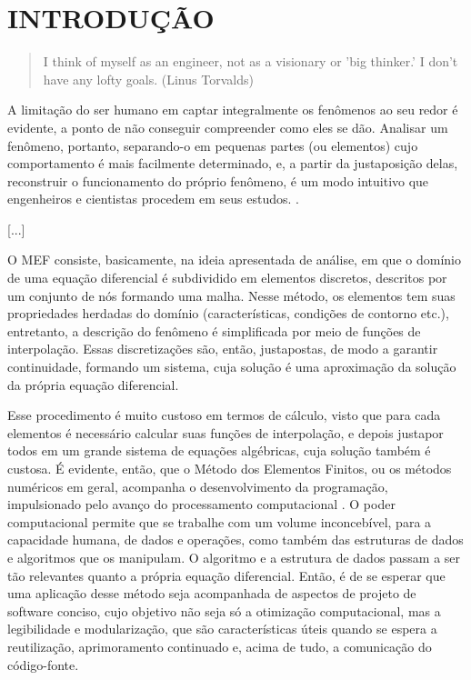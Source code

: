 

\chapter{INTRODUÇÃO}

\begin{quote}
    I think of myself as an engineer, not as a visionary or 'big thinker.' I don't have any lofty goals.
    (Linus Torvalds)  
\end{quote}

A limitação do ser humano em captar integralmente os fenômenos ao seu redor é evidente, a ponto de não conseguir compreender como eles se dão. Analisar um fenômeno, portanto, separando-o em pequenas partes (ou elementos) cujo comportamento é mais facilmente determinado, e, a partir da justaposição delas, reconstruir o funcionamento do próprio fenômeno, é um modo intuitivo que engenheiros e cientistas procedem em seus estudos. \cite[p. 2]{Zin}.


[...]


O MEF consiste, basicamente, na ideia apresentada de análise, em que o domínio de uma equação diferencial é subdividido em elementos discretos, descritos por um conjunto de nós formando uma malha. Nesse método, os elementos tem suas propriedades herdadas do domínio (características, condições de contorno etc.), entretanto, a descrição do fenômeno é simplificada por meio de funções de interpolação. Essas discretizações são, então, justapostas, de modo a garantir continuidade, formando um sistema, cuja solução é uma aproximação da solução da própria equação diferencial. 

Esse procedimento é muito custoso em termos de cálculo, visto que para cada elementos é necessário calcular suas funções de interpolação, e depois justapor todos em um grande sistema de equações algébricas, cuja solução também é custosa. É evidente, então, que o Método dos Elementos Finitos, ou os métodos numéricos em geral, acompanha o desenvolvimento da programação, impulsionado pelo avanço do processamento computacional \cite{Onate}. O poder computacional permite que se trabalhe com um volume inconcebível, para a capacidade humana, de dados e operações, como também das estruturas de dados e algoritmos que os manipulam. O algoritmo e a estrutura de dados passam a ser tão relevantes quanto a própria equação diferencial. Então, é de se esperar que uma aplicação desse método seja acompanhada de aspectos de projeto de software conciso, cujo objetivo não seja só a otimização computacional, mas a legibilidade e modularização, que são características úteis quando se espera a reutilização, aprimoramento continuado e, acima de tudo, a comunicação do código-fonte.


